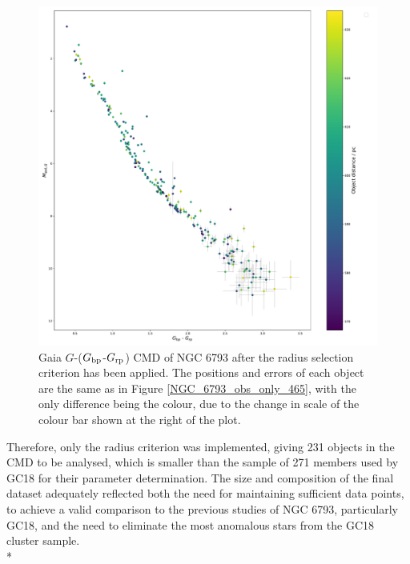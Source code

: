 \documentclass[12pt, a4paper]{report}
\begin{document}
\begin{figure}[h!]
\begin{center}
\includegraphics[width=1.0\textwidth]{../NGC_6793_CMD_observational_errorbars_vizier.pdf}
\caption{Gaia $G$-($G_{\textnormal{bp}}$-$G_{\textnormal{rp}}$) CMD of NGC 6793 after the radius selection criterion has been applied. The positions and errors of each object are the same as in Figure \ref{NGC_6793_obs_only_465}, with the only difference being the colour, due to the change in scale of the colour bar shown at the right of the plot.}
\label{NGC_6793_obs_only}
\end{center}
\end{figure}

Therefore, only the radius criterion was implemented, giving 231 objects in the CMD to be analysed, which is smaller than the sample of 271 members used by GC18 for their parameter determination. The size and composition of the final dataset adequately reflected both the need for maintaining sufficient data points, to achieve a valid comparison to the previous studies of NGC 6793, particularly GC18, and the need to eliminate the most anomalous stars from the GC18 cluster sample.\\*
\end{document}

